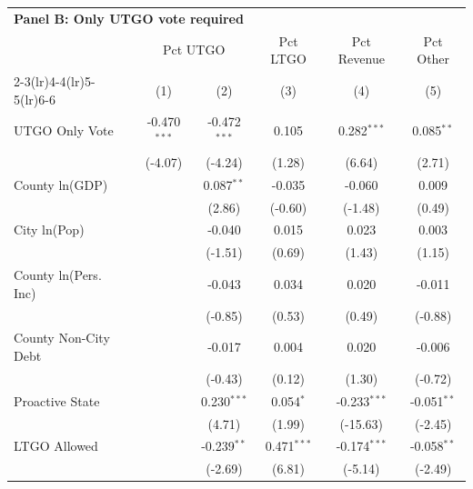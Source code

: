 \begingroup
\centering
\begin{tabular*}{\textwidth}{@{\extracolsep{\fill}}lccccc}
\multicolumn{5}{l}{\textbf{Panel B: Only UTGO vote required}}\\

\addlinespace
   \toprule
    & \multicolumn{2}{c}{Pct UTGO} & Pct LTGO & Pct Revenue & Pct Other\\
   \cmidrule(lr){2-3}\cmidrule(lr){4-4}\cmidrule(lr){5-5}\cmidrule(lr){6-6}
                        & (1)            & (2)            & (3)            & (4)            & (5)\\  
   \midrule 
   UTGO Only Vote       & -0.470$^{***}$ & -0.472$^{***}$ & 0.105          & 0.282$^{***}$  & 0.085$^{**}$\\   
                        & (-4.07)       & (-4.24)       & (1.28)        & (6.64)        & (2.71)\\   
   County ln(GDP)       &                & 0.087$^{**}$   & -0.035         & -0.060         & 0.009\\   
                        &                & (2.86)        & (-0.60)       & (-1.48)       & (0.49)\\   
   City ln(Pop)         &                & -0.040         & 0.015          & 0.023          & 0.003\\   
                        &                & (-1.51)       & (0.69)        & (1.43)        & (1.15)\\   
   County ln(Pers. Inc) &                & -0.043         & 0.034          & 0.020          & -0.011\\   
                        &                & (-0.85)       & (0.53)        & (0.49)        & (-0.88)\\   
   County Non-City Debt &                & -0.017         & 0.004          & 0.020          & -0.006\\   
                        &                & (-0.43)       & (0.12)        & (1.30)        & (-0.72)\\   
   Proactive State      &                & 0.230$^{***}$  & 0.054$^{*}$    & -0.233$^{***}$ & -0.051$^{**}$\\   
                        &                & (4.71)        & (1.99)        & (-15.63)      & (-2.45)\\   
   LTGO Allowed         &                & -0.239$^{**}$  & 0.471$^{***}$  & -0.174$^{***}$ & -0.058$^{**}$\\   
                        &                & (-2.69)       & (6.81)        & (-5.14)       & (-2.49)\\   

\end{tabular*}

